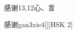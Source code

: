 \begin{entry}{感谢}{13,12}{⼼、⾔}
  \begin{phonetics}{感谢}{gan3xie4}[][HSK 2]
  \end{phonetics}
\end{entry}
